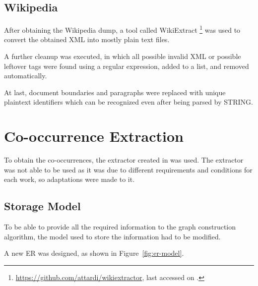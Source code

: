 \subsection{Wikipedia}

After obtaining the Wikipedia dump, a tool called WikiExtract
\footnote{\url{https://github.com/attardi/wikiextractor}, last accessed on
.} was used to convert the obtained XML into mostly plain
text files.

A further cleanup was executed, in which all possible invalid \ac{XML} or
possible leftover tags were found using a regular expression, added to a list,
and removed automatically.

At last, document boundaries and paragraphs were replaced with unique
plaintext identifiers which can be recognized even after being parsed by
\ac{STRING}.

\section{Co-occurrence Extraction}

To obtain the co-occurrences, the extractor created in \cite{correia2015syntax}
was used. The extractor was not able to be used as it was due to different
requirements and conditions for each work, so adaptations were made to it.

\subsection{Storage Model}

To be able to provide all the required information to the graph construction
algorithm, the model used to store the information had to be modified.

A new \ac{ER} was designed, as shown in Figure~\ref{fig:er-model}.

